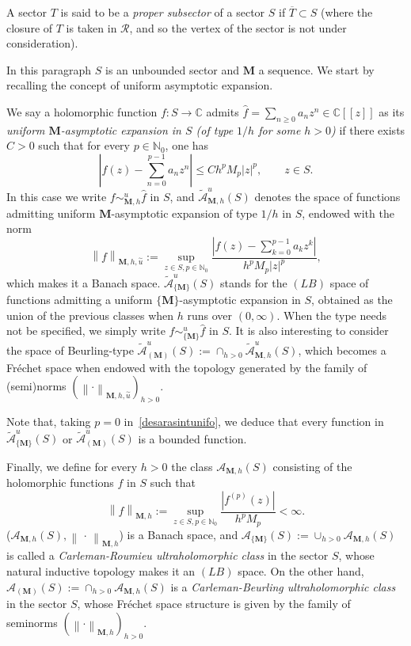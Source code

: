 \documentclass[11pt,a4paper]{article}
\theoremstyle{plain}
\theoremstyle{definition}
\numberwithin{equation}{section}
\newcommand{\N}{\mathbb{N}}
\newcommand{\C}{\mathbb{C}}
\newcommand{\M}{{\boldsymbol{M}}}
\begin{document}
A sector $T$ is said to be a \emph{proper subsector} of a sector $S$ if $\overline{T}\subset S$ (where the closure of $T$ is taken in $\mathcal{R}$, and so the vertex of the sector is not under consideration).

In this paragraph $S$ is an unbounded sector and $\M$ a sequence. We start by recalling the concept of uniform asymptotic expansion.

We say a holomorphic function $f\colon S\to\C$ admits $\widehat{f}=\sum_{n\ge 0}a_nz^n\in\C[[z]]$ as its \emph{uniform $\M$-asymptotic expansion in $S$ (of type $1/h$ for some $h>0$)} if there exists $C>0$ such that for every $p\in\N_0$, one has
\begin{equation}\left|f(z)-\sum_{n=0}^{p-1}a_nz^n \right|\le Ch^pM_{p}|z|^p,\qquad z\in S.\label{desarasintunifo}
\end{equation}
In this case we write $f\sim_{\M,h}^u\widehat{f}$ in $S$, and $\widetilde{\mathcal{A}}^u_{\M,h}(S)$ denotes the space of functions admitting uniform $\M$-asymptotic expansion of type $1/h$ in $S$, endowed with the norm
\begin{equation}\label{eq.NormUniformAsymptFixedType}
\left\|f\right\|_{\M,h,\overset{\sim}{u}}:=\sup_{z\in S,p\in\N_{0}}\frac{|f(z)-\sum_{k=0}^{p-1}a_kz^k|}{h^{p}M_{p}|z|^p},
\end{equation}
which makes it a Banach space. $\widetilde{\mathcal{A}}^u_{\{\M\}}(S)$ stands for the $(LB)$ space of functions admitting a uniform $\{\M\}$-asymptotic expansion in $S$, obtained as the union of the previous classes when $h$ runs over $(0,\infty)$. When the type needs not be specified, we simply write $f\sim_{\{\M\}}^u\widehat{f}$ in $S$.
It is also interesting to consider the space of Beurling-type $\widetilde{\mathcal{A}}^u_{(\M)}(S):=\cap_{h>0}\widetilde{\mathcal{A}}^u_{\M,h}(S)$, which becomes a Fr\'echet space when endowed with the topology generated by the family of (semi)norms $(\left\|\cdot\right\|_{\M,h,\overset{\sim}{u}})_{h>0}$.

Note that, taking $p=0$ in~\eqref{desarasintunifo}, we deduce that every function in $\widetilde{\mathcal{A}}^u_{\{\M\}}(S)$ or $\widetilde{\mathcal{A}}^u_{(\M)}(S)$ is a bounded function.

Finally, we define for every $h>0$ the class $\mathcal{A}_{\M,h}(S)$ consisting of the holomorphic functions $f$ in $S$ such that
$$
\left\|f\right\|_{\M,h}:=\sup_{z\in S,p\in\N_{0}}\frac{|f^{(p)}(z)|}{h^{p}M_{p}}<\infty.
$$
($\mathcal{A}_{\M,h}(S),\left\|\,\cdot\, \right\|_{\M,h}$) is a Banach space, and $\mathcal{A}_{\{\M\}}(S):=\cup_{h>0}\mathcal{A}_{\M,h}(S)$ is called a \emph{Carleman-Roumieu ultraholomorphic class} in the sector $S$, whose natural inductive topology makes it an $(LB)$ space. On the other hand, $\mathcal{A}_{(\M)}(S):=\cap_{h>0}\mathcal{A}_{\M,h}(S)$ is a \emph{Carleman-Beurling ultraholomorphic class} in the sector $S$, whose Fr\'echet space structure is given by the family of seminorms $(\left\|\cdot\right\|_{\M,h})_{h>0}$.\par
\end{document}
